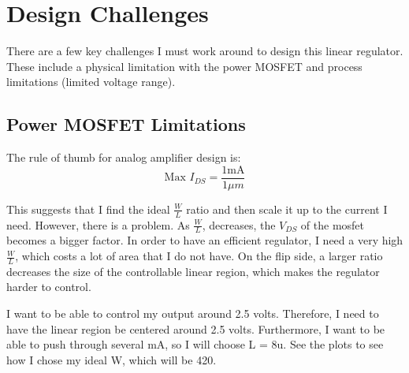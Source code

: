 \documentclass[10pt]{amsart}
\begin{document}
\section{Design Challenges}

There are a few key challenges I must work around to design this linear regulator. These include a physical limitation with the power MOSFET and process limitations (limited voltage range).

\subsection{Power MOSFET Limitations}

The rule of thumb for analog amplifier design is:
\begin{equation}
\text{Max } I_{DS} = \frac{1 \text{mA}}{ 1 \mu m}
\end{equation}

This suggests that I find the ideal $\frac{W}{L}$ ratio and then scale it up to the current I need. However, there is a problem. As $\frac{W}{L}$, decreases, the $V_{DS}$ of the mosfet becomes a bigger factor. In order to have an efficient regulator, I need a very high $\frac{W}{L}$, which costs a lot of area that I do not have. On the flip side, a larger ratio decreases the size of the controllable linear region, which makes the regulator harder to control.

I want to be able to control my output around 2.5 volts. Therefore, I need to have the linear region be centered around 2.5 volts. Furthermore, I want to be able to push through several mA, so I will choose L = 8u. See the plots to see how I chose my ideal W, which will be 420.
\end{document}
